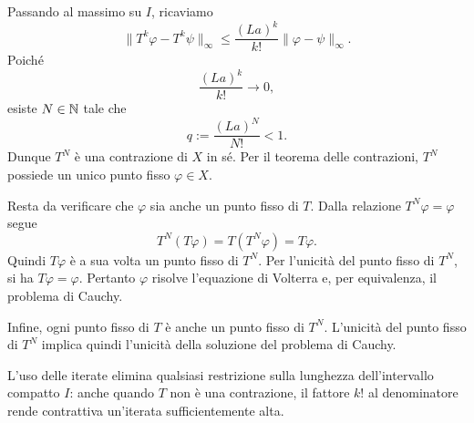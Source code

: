 \documentclass[a4paper]{article}
\begin{document}
\begin{radioactive}
\begin{snippetproof}{}
Passando al massimo su \(I\), ricaviamo
\[
	\lVert T^k\varphi-T^k\psi\rVert_\infty
	\leq
	\frac{(La)^k}{k!}\lVert\varphi-\psi\rVert_\infty.
\]
Poiché
\[
	\frac{(La)^k}{k!}\longrightarrow0,
\]
esiste \(N\in\mathbb{N}\) tale che
\[
	q:=\frac{(La)^N}{N!}<1.
\]
Dunque \(T^N\) è una contrazione di \(X\) in sé. Per il teorema delle contrazioni, \(T^N\) possiede un unico punto fisso \(\varphi\in X\).

Resta da verificare che \(\varphi\) sia anche un punto fisso di \(T\). Dalla relazione \(T^N\varphi=\varphi\) segue
\[
	T^N(T\varphi)=T(T^N\varphi)=T\varphi.
\]
Quindi \(T\varphi\) è a sua volta un punto fisso di \(T^N\). Per l'unicità del punto fisso di \(T^N\), si ha \(T\varphi=\varphi\). Pertanto \(\varphi\) risolve l'equazione di Volterra e, per equivalenza, il problema di Cauchy.

Infine, ogni punto fisso di \(T\) è anche un punto fisso di \(T^N\). L'unicità del punto fisso di \(T^N\) implica quindi l'unicità della soluzione del problema di Cauchy.
\end{snippetproof}
\end{radioactive}

\begin{radioactive}
L'uso delle iterate elimina qualsiasi restrizione sulla lunghezza dell'intervallo compatto \(I\): anche quando \(T\) non è una contrazione, il fattore \(k!\) al denominatore rende contrattiva un'iterata sufficientemente alta.
\end{radioactive}
     

\pagebreak
\end{document}

